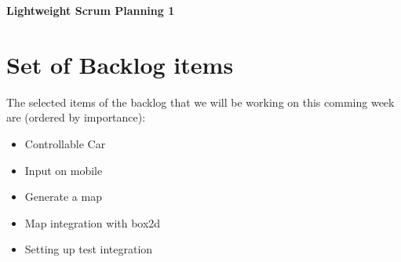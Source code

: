 \documentclass{article}
\begin{document}
\begin{minipage}[H]{\textwidth}
\vspace{0.3cm}
		\begin{center}
		\vspace{0.3cm}
			\Huge{\textbf{Lightweight Scrum Planning 1}}\\
		\vspace{0.3cm}	
		\vspace{0.7cm}		
		\end{center}
	\end{minipage}

\section*{Set of Backlog items}
The selected items of the backlog that we will be working on this comming week  are (ordered by importance):
\begin{itemize}
	\item Controllable Car
	\item Input on mobile
	\item Generate a map
	\item Map integration with box2d
	\item Setting up test integration
\end{itemize}
\end{document}
